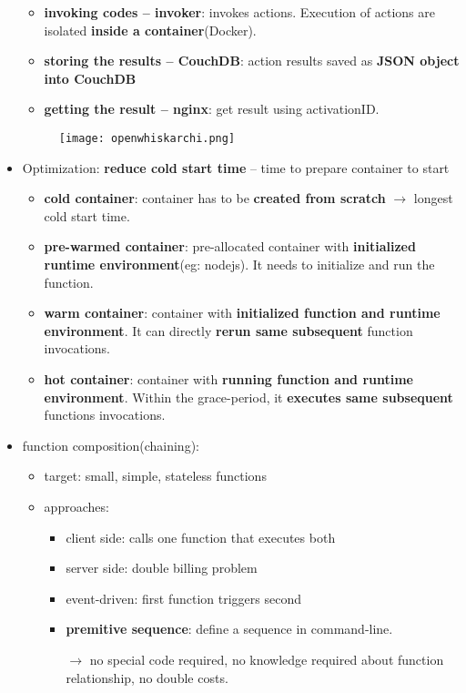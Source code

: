 \begin{itemize}
\begin{itemize}
		\item \textbf{invoking codes -- invoker}: invokes actions. Execution of actions are isolated \textbf{inside a container}(Docker).  
		\item \textbf{storing the results -- CouchDB}: action results saved as \textbf{JSON object into CouchDB}
		\item \textbf{getting the result -- nginx}: get result using activationID. 
	\end{itemize}
	\begin{figure}[H]
		\centering
		\texttt{[image: openwhiskarchi.png]}
	\end{figure}




	\item Optimization: \textbf{reduce cold start time} -- time to prepare container to start
	\begin{itemize}
		\item \textbf{cold container}: container has to be \textbf{created from scratch} $\rightarrow$ longest cold start time.
		\item \textbf{pre-warmed container}: pre-allocated container with \textbf{initialized runtime environment}(eg: nodejs). It needs to initialize and run the function.   
		\item \textbf{warm container}: container with \textbf{initialized function and runtime environment}. It can directly \textbf{rerun same subsequent} function invocations. 
		\item \textbf{hot container}: container with \textbf{running function and runtime environment}. Within the grace-period, it \textbf{executes same subsequent} functions invocations. 
	\end{itemize}
	
	
	\item function composition(chaining): 
	\begin{itemize}
		\item target: small, simple, stateless functions
		\item approaches:
		\begin{itemize}
			\item client side: calls one function that executes both
			\item server side: double billing problem
			\item event-driven: first function triggers second
			\item \textbf{premitive sequence}: define a sequence in command-line.
			
			$\rightarrow$ no special code required, no knowledge required about function relationship, no double costs.
		\end{itemize}
	\end{itemize}
	
\end{itemize}




